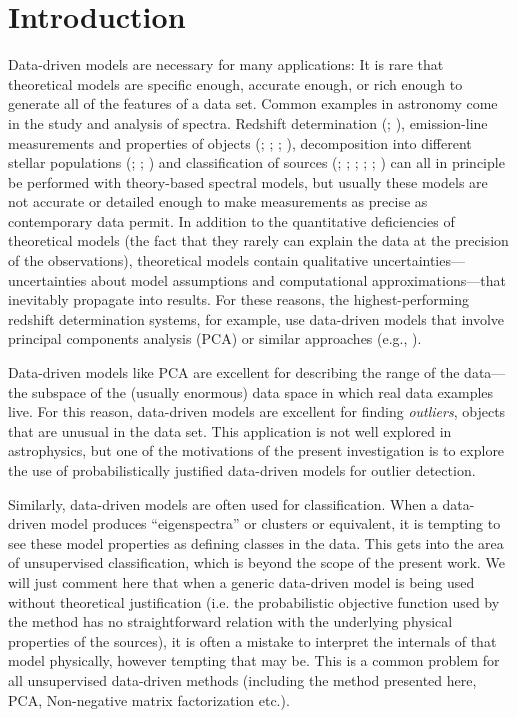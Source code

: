 \documentclass[12pt,preprint]{aastex}
\begin{document}
\section{Introduction}\label{sec:introduction}
Data-driven models are necessary for many applications: It is rare
that theoretical models are specific enough, accurate enough, or rich
enough to generate all of the features of a data set.  Common examples 
in astronomy come in the study and analysis of spectra.  Redshift
determination (\citealt{budavari}; \citealt{glazebrook}),
emission-line measurements and properties of objects (\citealt{allen}; 
\citealt{borosona}; \citealt{borosonc}; \citealt{wild}), 
decomposition into different stellar populations (\citealt{chen}; 
\citealt{ferreras}; \citealt{nolan}) and
classification of sources (\citealt{borosona}; \citealt{connolly};
\citealt{francis}; \citealt{suzuki}; \citealt{yip}; \citealt{yipb}) can all in
principle be performed with theory-based spectral models, but usually these 
models are not accurate or detailed enough to make
measurements as precise as contemporary data permit.  In addition to
the quantitative deficiencies of theoretical models (the fact that
they rarely can explain the data at the precision of the
observations), theoretical models contain qualitative
uncertainties---uncertainties about model assumptions and
computational approximations---that inevitably propagate into results.
For these reasons, the highest-performing redshift determination
systems, for example, use data-driven models that involve principal
components analysis (PCA) or similar approaches (e.g., \citealt{sdssdr7}).

Data-driven models like PCA are excellent for describing the range of
the data---the subspace of the (usually enormous) data space in which
real data examples live.  For this reason, data-driven models are
excellent for finding \emph{outliers}, objects that are unusual in the
data set.  This application is not well explored in astrophysics,
but one of the motivations of the present investigation is to explore
the use of probabilistically justified data-driven models for outlier
detection.

Similarly, data-driven models are often used for classification.  When
a data-driven model produces ``eigenspectra'' or clusters or
equivalent, it is tempting to see these model properties as defining
classes in the data.  This gets into the area of unsupervised
classification, which is beyond the scope of the present work.
We will just comment here that when a
generic data-driven model is being used without theoretical
justification (i.e. the probabilistic objective function used by the 
method has no straightforward relation with the underlying physical properties 
of the sources), it is often a mistake to interpret the internals of
that model physically, however tempting that may be. This is a 
common problem for all unsupervised data-driven methods (including the 
method presented here, PCA, Non-negative matrix factorization etc.).
\end{document}
